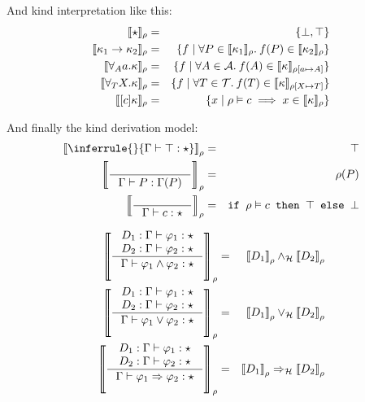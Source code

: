 \documentclass[english, mgr]{iithesis}
\begin{document}
And kind interpretation like this:
\begin{eqnarray*}
\llbracket \star \rrbracket_{\rho}                      & = & \{ \bot, \top \} \\
\llbracket \kappa_1 \to \kappa_2 \rrbracket_{\rho}     & = & \{f \mid \forall P \in \llbracket \kappa_1 \rrbracket_{\rho}.\: f(P) \in \llbracket \kappa_2 \rrbracket_{\rho} \} \\
\llbracket \forall_A a .\kappa \rrbracket_{\rho}   & = & \{f \mid \forall A \in \mathcal{A}.\: f(A) \in \llbracket \kappa \rrbracket_{\rho[a \mapsto A]}\} \\
\llbracket \forall_T X .\kappa \rrbracket_{\rho}   & = & \{f \mid \forall T \in \mathcal{T}.\: f(T) \in \llbracket \kappa \rrbracket_{\rho[X \mapsto T]}\} \\
\llbracket [c]\kappa \rrbracket_{\rho}       & = & \{x \mid \rho \vDash c \implies x \in \llbracket \kappa \rrbracket_{\rho} \}
\end{eqnarray*}



And finally the kind derivation model:
\begin{eqnarray*}
\interp{\inferrule{ }{\types{\top}{\kProp}}} & = & \top \\
\interp{\inference{ }{\types{ \propv}{\Gamma( \propv)}}} & = & \tmEnv(\propv) \\
    \interp{\inference{}{\types{\constr}{\kProp}}} & = & \texttt{if } \tmEnv \vDash \constr \texttt{ then } \top \texttt{ else } \bot
\end{eqnarray*}

\begin{eqnarray*}
    \interp{
        \inference{D_1 : \types{\formphi_1 }{\kProp} \\ D_2 : \types{\formphi_2 }{\kProp}
    }{
        \types{\formphi_1 \wedge \formphi_2}{\kProp}}
    } & = & \interp{D_1} \wedge_\PropAlg \interp{D_2} \\
    \interp{
        \inference{D_1 : \types{\formphi_1 }{\kProp}  \\ D_2 : \types{\formphi_2 }{\kProp}
    }{
        \types{\formphi_1 \vee \formphi_2}{\kProp}}
    } & = & \interp{D_1} \vee_\PropAlg \interp{D_2} \\
    \interp{
        \inference{D_1 : \types{\formphi_1 }{\kProp}  \\ D_2 : \types{\formphi_2 }{\kProp}
    }{
        \types{\formphi_1 \Rightarrow \formphi_2}{\kProp}}
    } & = & \interp{D_1} \Rightarrow_\PropAlg \interp{D_2}
\end{eqnarray*}
\end{document}
